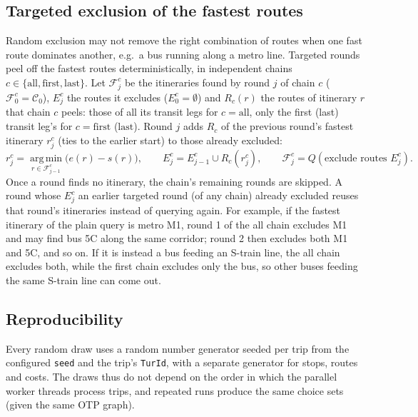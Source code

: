 \documentclass[11pt,a4paper]{article}
\newcommand{\code}[1]{\texttt{#1}}
\newcommand{\cand}{\mathcal{C}}
\begin{document}
\subsection{Targeted exclusion of the fastest routes}
Random exclusion may not remove the right combination of routes when one fast route dominates
another, e.g.\ a bus running along a metro line. Targeted rounds peel off the fastest routes
deterministically, in independent chains $c \in \{\text{all}, \text{first}, \text{last}\}$. Let
$\mathcal{F}^c_j$ be the itineraries found by round $j$ of chain $c$ ($\mathcal{F}^c_0 = \cand_0$),
$E^c_j$ the routes it excludes ($E^c_0 = \emptyset$) and $R_c(r)$ the routes of itinerary $r$ that chain
$c$ peels: those of all its transit legs for $c = \text{all}$, only the first (last) transit leg's for
$c = \text{first}$ ($\text{last}$). Round $j$ adds $R_c$ of the previous round's fastest itinerary
$r^c_j$ (ties to the earlier start) to those already excluded:
\begin{equation}
  r^c_j = \operatorname*{arg\,min}_{r \in \mathcal{F}^c_{j-1}} \bigl(e(r) - s(r)\bigr), \qquad
  E^c_j = E^c_{j-1} \cup R_c(r^c_j), \qquad
  \mathcal{F}^c_j = Q(\text{exclude routes } E^c_j).
\end{equation}
Once a round finds no itinerary, the chain's remaining rounds are skipped. A round whose $E^c_j$ an
earlier targeted round (of any chain) already excluded reuses that round's itineraries instead of
querying again.
For example, if the fastest itinerary of the plain query is metro M1, round 1 of the all chain excludes M1 and may find bus 5C along the same corridor; round 2 then excludes both M1 and 5C, and so on. If it is instead a bus feeding an S-train line, the all chain excludes both, while the first chain excludes only the bus, so other buses feeding the same S-train line can come out.

\subsection{Reproducibility}

Every random draw uses a random number generator seeded per trip from the configured \code{seed} and the trip's \code{TurId}, with a separate generator for stops, routes and costs. The draws thus do not depend on the order in which the parallel worker threads process trips, and repeated runs produce the same choice sets (given the same OTP graph).
\end{document}
